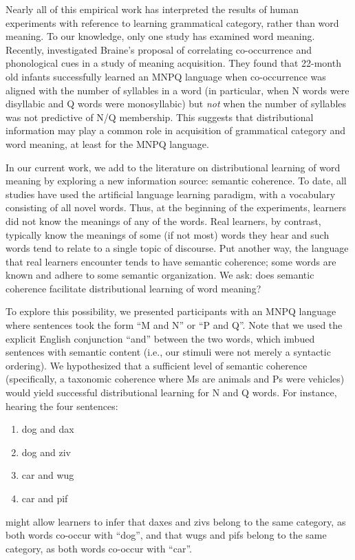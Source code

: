 \documentclass[man,floatsintext]{apa6}
\begin{document}
Nearly all of this empirical work has interpreted the results of human experiments with reference to learning grammatical category, rather than word meaning. To our knowledge, only one study has examined word meaning. Recently, \citet{lany2010} investigated Braine's proposal of correlating co-occurrence and phonological cues in a study of meaning acquisition. They found that 22-month old infants successfully learned an MNPQ language when co-occurrence was aligned with the number of syllables in a word (in particular, when N words were disyllabic and Q words were monosyllabic) but \emph{not} when the number of syllables was not predictive of N/Q membership. This suggests that distributional information may play a common role in acquisition of grammatical category and word meaning, at least for the MNPQ language. 

In our current work, we add to the literature on distributional learning of word meaning by exploring a new information source: semantic coherence. To date, all studies have used the artificial language learning paradigm, with a vocabulary consisting of all novel words. Thus, at the beginning of the experiments, learners did not know the meanings of any of the words. Real learners, by contrast, typically know the meanings of some (if not most) words they hear and such words tend to relate to a single topic of discourse. Put another way, the language that real learners encounter tends to have semantic coherence; some words are known and adhere to some semantic organization. We ask: does semantic coherence facilitate distributional learning of word meaning?

To explore this possibility, we presented participants with an MNPQ language where sentences took the form ``M and N'' or ``P and Q''. Note that we used the explicit English conjunction ``and'' between the two words, which imbued sentences with semantic content (i.e., our stimuli were not merely a syntactic ordering). We hypothesized that a sufficient level of semantic coherence (specifically, a taxonomic coherence where Ms are animals and Ps were vehicles) would yield successful distributional learning for N and Q words. For instance, hearing the four sentences:
\begin{enumerate}
\item dog and dax
\item dog and ziv
\item car and wug
\item car and pif
\end{enumerate} might allow learners to infer that daxes and zivs belong to the same category, as both words co-occur with ``dog'', and that wugs and pifs belong to the same category, as both words co-occur with ``car''.
\end{document}
